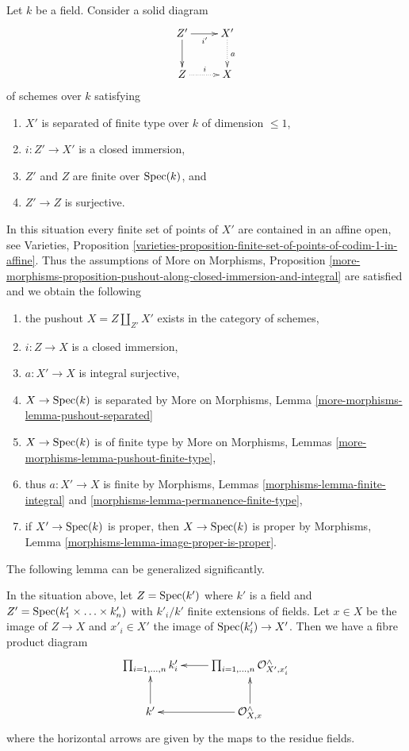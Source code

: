 \noindent
Let $k$ be a field. Consider a solid diagram
$$
\xymatrix{
Z' \ar[d] \ar[r]_{i'} & X' \ar@{..>}[d]^a \\
Z \ar@{..>}[r]^i & X
}
$$
of schemes over $k$ satisfying
\begin{enumerate}
\item[(a)] $X'$ is separated of finite type over $k$ of dimension $\leq 1$,
\item[(b)] $i : Z' \to X'$ is a closed immersion,
\item[(c)] $Z'$ and $Z$ are finite over $\mathop{\mathrm{Spec}}(k)$, and
\item[(d)] $Z' \to Z$ is surjective.
\end{enumerate}
In this situation every finite set of points of $X'$ are contained
in an affine open, see Varieties, Proposition
\ref{varieties-proposition-finite-set-of-points-of-codim-1-in-affine}.
Thus the assumptions of
More on Morphisms, Proposition
\ref{more-morphisms-proposition-pushout-along-closed-immersion-and-integral}
are satisfied and we obtain the following
\begin{enumerate}
\item the pushout $X = Z \amalg_{Z'} X'$ exists in the category of schemes,
\item $i : Z \to X$ is a closed immersion,
\item $a : X' \to X$ is integral surjective,
\item $X \to \mathop{\mathrm{Spec}}(k)$ is separated by More on Morphisms, Lemma
\ref{more-morphisms-lemma-pushout-separated}
\item $X \to \mathop{\mathrm{Spec}}(k)$ is of finite type by
More on Morphisms, Lemmas \ref{more-morphisms-lemma-pushout-finite-type},
\item thus $a : X' \to X$ is finite by
Morphisms, Lemmas \ref{morphisms-lemma-finite-integral} and
\ref{morphisms-lemma-permanence-finite-type},
\item if $X' \to \mathop{\mathrm{Spec}}(k)$ is proper, then $X \to \mathop{\mathrm{Spec}}(k)$ is proper
by Morphisms, Lemma \ref{morphisms-lemma-image-proper-is-proper}.
\end{enumerate}

\noindent
The following lemma can be generalized significantly.

\begin{lemma}
\label{lemma-complete-local-ring-pushout}
In the situation above, let $Z = \mathop{\mathrm{Spec}}(k')$ where $k'$ is a field and
$Z' = \mathop{\mathrm{Spec}}(k'_1 \times \ldots \times k'_n)$ with $k'_i/k'$
finite extensions of fields. Let $x \in X$ be the image of $Z \to X$
and $x'_i \in X'$ the image of $\mathop{\mathrm{Spec}}(k'_i) \to X'$.
Then we have a fibre product diagram
$$
\xymatrix{
\prod\nolimits_{i = 1, \ldots, n} k'_i &
\prod\nolimits_{i = 1, \ldots, n} \mathcal{O}_{X', x'_i}^\wedge \ar[l] \\
k' \ar[u] &
\mathcal{O}_{X, x}^\wedge \ar[u] \ar[l]
}
$$
where the horizontal arrows are given by the maps to the residue fields.
\end{lemma}

